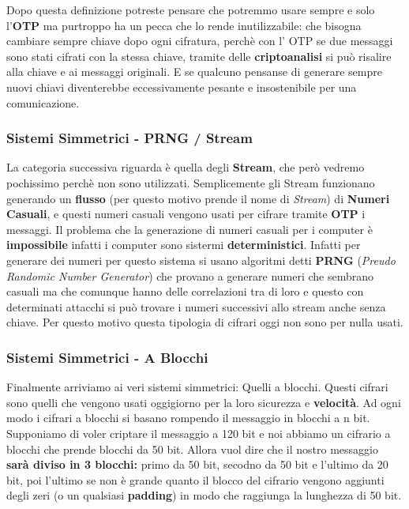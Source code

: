 \documentclass{report}
\begin{document}
Dopo questa definizione potreste pensare che potremmo usare sempre e solo l'\textbf{OTP} ma purtroppo ha un pecca che lo rende inutilizzabile: che bisogna cambiare sempre chiave dopo ogni cifratura, perchè con l' OTP se due messaggi sono stati cifrati con la stessa chiave, tramite delle \textbf{criptoanalisi} si può risalire alla chiave e ai messaggi originali. E se qualcuno pensanse di generare sempre nuovi chiavi diventerebbe eccessivamente pesante e insostenibile per una comunicazione.


\subsubsection{Sistemi Simmetrici - PRNG / Stream}

La categoria successiva riguarda è quella degli \textbf{Stream}, che però vedremo pochissimo perchè non sono utilizzati. Semplicemente gli Stream funzionano generando un \textbf{flusso} (per questo motivo prende il nome di \textit{Stream}) di \textbf{Numeri Casuali}, e questi numeri casuali vengono usati per cifrare tramite \textbf{OTP} i messaggi. Il problema che la generazione di numeri casuali per i computer è \textbf{impossibile} infatti i computer sono sistermi \textbf{deterministici}. Infatti per generare dei numeri per questo sistema si usano algoritmi detti \textbf{PRNG} (\textit{Preudo Randomic Number Generator}) che provano a generare numeri che sembrano casuali ma che comunque hanno delle correlazioni tra di loro e questo con determinati attacchi si può trovare i numeri successivi allo stream anche senza chiave. Per questo motivo questa tipologia di cifrari oggi non sono per nulla usati.

\newpage
\subsubsection{Sistemi Simmetrici - A Blocchi}

Finalmente arriviamo ai veri sistemi simmetrici: Quelli a blocchi. Questi cifrari sono quelli che vengono usati oggigiorno per la loro sicurezza e \textbf{velocità}. Ad ogni modo i cifrari a blocchi si basano rompendo il messaggio in blocchi a n bit. Supponiamo di voler criptare il messaggio a 120 bit e noi abbiamo un cifrario a blocchi che prende blocchi da 50 bit. Allora vuol dire che il nostro messaggio \textbf{sarà diviso in 3 blocchi: } primo da 50 bit, secodno da 50 bit e l'ultimo da 20 bit, poi l'ultimo se non è grande quanto il blocco del cifrario vengono aggiunti degli zeri (o un qualsiasi \textbf{padding}) in modo che raggiunga la lunghezza di 50 bit.
\end{document}

